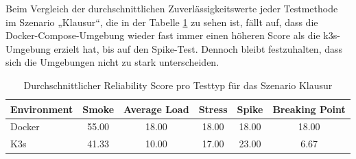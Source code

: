 Beim Vergleich der durchschnittlichen Zuverlässigkeitswerte jeder Testmethode im Szenario „Klausur“, die in der Tabelle \ref{tab:scenario_score_matrix_klausur} zu sehen ist, fällt auf, dass die Docker-Compose-Umgebung wieder fast immer einen höheren Score als die k3s-Umgebung erzielt hat, bis auf den Spike-Test.
Dennoch bleibt festzuhalten, dass sich die Umgebungen nicht zu stark unterscheiden.
\begin{table}[htbp]
\centering
\caption{Durchschnittlicher Reliability Score pro Testtyp für das Szenario Klausur}
\label{tab:scenario_score_matrix_klausur}

\begin{tabular}{lccccc}
\toprule
\textbf{Environment} & \textbf{Smoke} & \textbf{Average Load} & \textbf{Stress} & \textbf{Spike} & \textbf{Breaking Point} \\
\midrule
Docker & 55.00 & 18.00 & 18.00 & 18.00 & 18.00 \\
K3s    & 41.33 & 10.00 & 17.00 & 23.00 & 6.67 \\
\bottomrule
\end{tabular}

\end{table}
\FloatBarrier